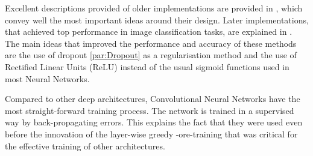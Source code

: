 \documentclass[a4paper]{article}
\begin{document}
		Excellent descriptions provided of older implementations are provided in \cite{LeCun1989,LeCun1990,Lecun1995,LeCun1998}, which convey well the most important ideas around their design. Later implementations, that achieved top performance in image classification tasks, are explained in \cite{Krizhevsky2012}. The main ideas that improved the performance and accuracy of these methods are the use of dropout \ref{par:Dropout} as a regularisation method and the use of Rectified Linear Units (ReLU) instead of the usual sigmoid functions used in most Neural Networks.
		
		Compared to other deep architectures, Convolutional Neural Networks have the most straight-forward training process. The network is trained in a supervised way by back-propagating errors. This explains the fact that they were used even before the innovation of the layer-wise greedy -ore-training that was critical for the effective training of other architectures.	
		
\end{document}
